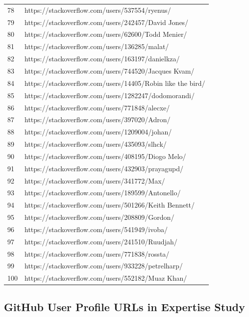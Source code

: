 \begin{center}
\begin{longtable}{|p{1.5cm}|p{12.5cm}|}
78 & https://stackoverflow.com/users/537554/ryenus/ \\
79 & https://stackoverflow.com/users/242457/David Jones/ \\
80 & https://stackoverflow.com/users/62600/Todd Menier/ \\
81 & https://stackoverflow.com/users/136285/malat/ \\
82 & https://stackoverflow.com/users/163197/danielkza/ \\
83 & https://stackoverflow.com/users/744520/Jacques Kvam/ \\
84 & https://stackoverflow.com/users/14405/Robin like the bird/ \\
85 & https://stackoverflow.com/users/1282247/dodomorandi/ \\
86 & https://stackoverflow.com/users/771848/alecxe/ \\
87 & https://stackoverflow.com/users/397020/Adron/ \\
88 & https://stackoverflow.com/users/1209004/johan/ \\
89 & https://stackoverflow.com/users/435093/slhck/ \\
90 & https://stackoverflow.com/users/408195/Diogo Melo/ \\
91 & https://stackoverflow.com/users/432903/prayagupd/ \\
92 & https://stackoverflow.com/users/341772/Max/ \\
93 & https://stackoverflow.com/users/189599/Antonello/ \\
94 & https://stackoverflow.com/users/501266/Keith Bennett/ \\
95 & https://stackoverflow.com/users/208809/Gordon/ \\
96 & https://stackoverflow.com/users/541949/ivoba/ \\
97 & https://stackoverflow.com/users/241510/Ruudjah/ \\
98 & https://stackoverflow.com/users/771838/rossta/ \\
99 & https://stackoverflow.com/users/933228/petrelharp/ \\
100 & https://stackoverflow.com/users/552182/Muaz Khan/ \\
\hline
\end{longtable}
\end{center}


\subsection{GitHub User Profile URLs in Expertise Study}

